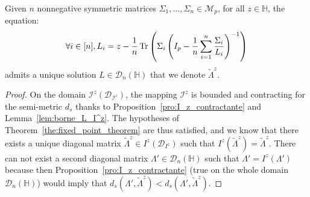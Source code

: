 \documentclass[a4papaer, titlepage]{book}
\begin{document}

\begin{theorem}\label{the:definition_existence_tilde_Lambda}
  Given $n$ nonnegative symmetric matrices $\Sigma_1,\ldots, \Sigma_n \in \mathcal M_{p}$, for all $z\in \mathbb H$, the equation:
  \begin{align}\label{eq:fixed_point_equation_tilde_lambda_theorem}
    \forall i \in [n], L_i = z - \frac{1}{n} \operatorname{Tr} \left(\Sigma_i \left(I_p - \frac{1}{n}\sum_{i=1}^n \frac{\Sigma_i}{L_i}\right)^{-1}\right)
  \end{align}
  admits a unique solution $L \in \mathcal D_n(\mathbb H)$ that we denote $\tilde \Lambda^z$.
\end{theorem}

\begin{proof}
On the domain $\mathcal I^z(\mathcal D_{\mathcal I^z})$, the mapping $\mathcal I^z$ is bounded and contracting for the semi-metric $d_s$ thanks to Proposition~\ref{pro:I_z_contractante} and Lemma~\ref{lem:borne_L_I^z}. The hypotheses of Theorem~\ref{the:fixed_point_theorem} are thus satisfied, and we know that there exists a unique diagonal matrix $\tilde \Lambda^z \in I^z(\mathcal D_{I^z})$ such that $I^z(\tilde \Lambda^z) = \tilde \Lambda^z$. There can not exist a second diagonal matrix $\Lambda' \in  \mathcal D_n(\mathbb H)$ such that $\Lambda' = I^z(\Lambda')$ because then Proposition~\ref{pro:I_z_contractante} (true on the whole domain $\mathcal D_n(\mathbb H)$) would imply that $d_s(\Lambda' ,\tilde \Lambda^z) < d_s(\Lambda' ,\tilde \Lambda^z)$.
\end{proof}
\end{document}
